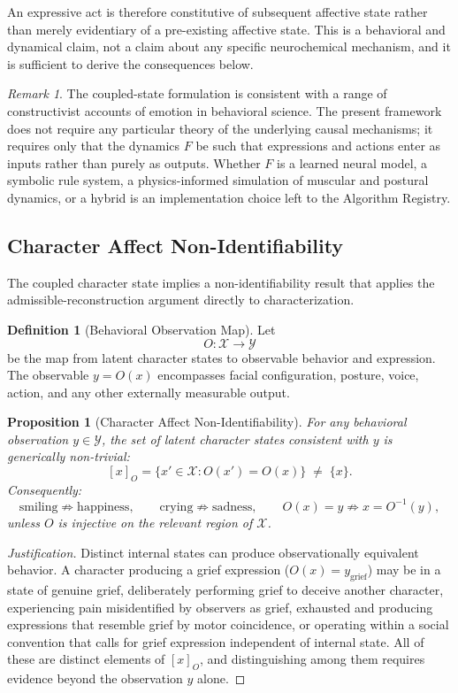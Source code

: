 \documentclass[11pt,a4paper]{article}
\theoremstyle{plain}
\newtheorem{proposition}[theorem]{Proposition}
\theoremstyle{definition}
\newtheorem{definition}[theorem]{Definition}
\theoremstyle{remark}
\newtheorem{remark}[theorem]{Remark}
\begin{document}
An expressive act is therefore constitutive of subsequent affective state rather than merely evidentiary of a pre-existing affective state. This is a behavioral and dynamical claim, not a claim about any specific neurochemical mechanism, and it is sufficient to derive the consequences below.

\begin{remark}
The coupled-state formulation is consistent with a range of constructivist accounts of emotion in behavioral science. The present framework does not require any particular theory of the underlying causal mechanisms; it requires only that the dynamics $F$ be such that expressions and actions enter as inputs rather than purely as outputs. Whether $F$ is a learned neural model, a symbolic rule system, a physics-informed simulation of muscular and postural dynamics, or a hybrid is an implementation choice left to the Algorithm Registry.
\end{remark}

\subsection{Character Affect Non-Identifiability}

The coupled character state implies a non-identifiability result that applies the admissible-reconstruction argument directly to characterization.

\begin{definition}[Behavioral Observation Map]
Let
\[
O : \mathcal{X} \to \mathcal{Y}
\]
be the map from latent character states to observable behavior and expression. The observable $y = O(x)$ encompasses facial configuration, posture, voice, action, and any other externally measurable output.
\end{definition}

\begin{proposition}[Character Affect Non-Identifiability]
\label{prop:affect-nonid}
For any behavioral observation $y \in \mathcal{Y}$, the set of latent character states consistent with $y$ is generically non-trivial:
\[
[x]_O = \{x' \in \mathcal{X} : O(x') = O(x)\} \;\neq\; \{x\}.
\]
Consequently:
\[
\text{smiling} \not\Rightarrow \text{happiness}, \qquad \text{crying} \not\Rightarrow \text{sadness}, \qquad O(x) = y \not\Rightarrow x = O^{-1}(y),
\]
unless $O$ is injective on the relevant region of $\mathcal{X}$.
\end{proposition}

\begin{proof}[Justification]
Distinct internal states can produce observationally equivalent behavior. A character producing a grief expression ($O(x) = y_{\mathrm{grief}}$) may be in a state of genuine grief, deliberately performing grief to deceive another character, experiencing pain misidentified by observers as grief, exhausted and producing expressions that resemble grief by motor coincidence, or operating within a social convention that calls for grief expression independent of internal state. All of these are distinct elements of $[x]_O$, and distinguishing among them requires evidence beyond the observation $y$ alone.
\end{proof}
\end{document}
